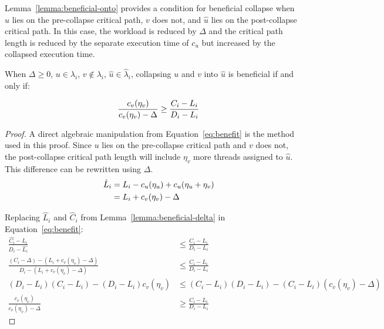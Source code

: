 Lemma~\ref{lemma:beneficial-onto} provides a condition for beneficial
collapse when ${u}$ lies on the pre-collapse critical path, ${v}$ does
not, and ${\hat{u}}$ lies on the post-collapse critical path. In this
case, the workload is reduced by ${\Delta}$ and the critical path
length is reduced by the separate execution time of ${c_u}$ but
increased by the collapsed execution time.

\begin{lemma}\label{lemma:beneficial-onto}
  When ${\Delta \ge 0}$, ${u \in \lambda_i}$, ${v \not \in
    \lambda_i}$, ${\hat{u} \in \hat{\lambda}_i}$, collapsing ${u}$ and
  ${v}$ into ${\hat{u}}$ is beneficial if and only if:

  \begin{equation}
    \indent
    \frac{c_v(\eta_v)}{c_v(\eta_v) - \Delta} \ge
    \frac{C_i - L_i}{D_i - L_i}
  \end{equation}

  \begin{proof}
    A direct algebraic manipulation from Equation~\ref{eq:benefit} is
    the method used in this proof. Since ${u}$ lies on the
    pre-collapse critical path and ${v}$ does not, the post-collapse
    critical path length will include ${\eta_v}$ more threads assigned
    to ${\hat{u}}$. This difference can be rewritten using ${\Delta}$.
    \begin{align*}
      \indent
      \hat{L}_i &= L_i - c_u(\eta_u) + c_u(\eta_u + \eta_v) \\
      &= L_i + c_v(\eta_v) - \Delta
    \end{align*}

    Replacing ${\hat{L}_i}$ and ${\hat{C}_i}$ from
    Lemma~\ref{lemma:beneficial-delta} in Equation~\ref{eq:benefit}:
    \begin{align*}
        \frac{\hat{C_i} - \hat{L_i}} 
             {D_i - \hat{L_i}} &\le
        \frac{C_i - L_i}
             {D_i - L_i} \\
        \frac{(C_i - \Delta) - (L_i + c_v(\eta_v) - \Delta)}
             {D_i - (L_i + c_v(\eta_v) - \Delta)} & \le
        \frac{C_i - L_i}
             {D_i - L_i} \\
        (D_i - L_i)(C_i - L_i) - (D_i - L_i)c_v(\eta_v) & \le
             (C_i - L_i)(D_i - L_i) - (C_i - L_i)(c_v(\eta_v) - \Delta) \\
        \frac{c_v(\eta_v)}{c_v(\eta_v) - \Delta} & \ge
        \frac{C_i - L_i}{D_i - L_i}
    \end{align*}
    
  \end{proof}
\end{lemma}
